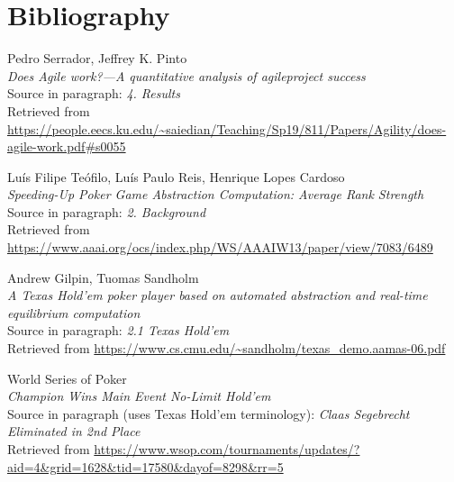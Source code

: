 \documentclass[11pt]{article}
\begin{document}
\section{Bibliography}
\renewcommand\refname{}
\begin{thebibliography}{9}
\hypertarget{agile_success}{}
\begin{flushleft}
	Pedro Serrador, Jeffrey K. Pinto \\
	\textit{Does Agile work?—A quantitative analysis of agileproject success} \\
	Source in paragraph: \textit{4. Results} \\
	Retrieved from \url{https://people.eecs.ku.edu/~saiedian/Teaching/Sp19/811/Papers/Agility/does-agile-work.pdf#s0055}
\end{flushleft}


\begin{flushleft}
\hypertarget{lookup}{}
	Luís Filipe Teófilo, Luís Paulo Reis, Henrique Lopes Cardoso \\
	\textit{Speeding-Up Poker Game Abstraction Computation: Average Rank Strength} \\
	Source in paragraph: \textit{2. Background} \\
	Retrieved from \url{https://www.aaai.org/ocs/index.php/WS/AAAIW13/paper/view/7083/6489}
\end{flushleft}

\begin{flushleft}
\hypertarget{research_texas}{}
	Andrew Gilpin, Tuomas Sandholm \\
	\textit{A Texas Hold’em poker player based on automated abstraction and real-time equilibrium computation} \\
	Source in paragraph: \textit{2.1 Texas Hold'em} \\
	Retrieved from \url{https://www.cs.cmu.edu/~sandholm/texas_demo.aamas-06.pdf}
\end{flushleft}


\hypertarget{wsop_texas}{}
\begin{flushleft}
	World Series of Poker \\
	\textit{Champion Wins Main Event No-Limit Hold'em} \\
	Source in paragraph (uses Texas Hold'em terminology): \textit{Claas Segebrecht Eliminated in 2nd Place} \\
	Retrieved from \url{https://www.wsop.com/tournaments/updates/?aid=4&grid=1628&tid=17580&dayof=8298&rr=5}
\end{flushleft}


\end{thebibliography}
\end{document}
